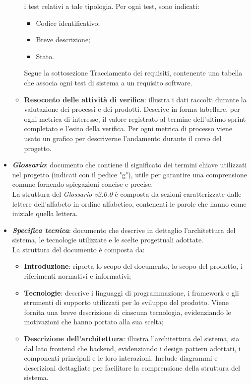 \begin{itemize}
\begin{itemize}
                        i test relativi a tale tipologia. Per ogni test, sono indicati:
                        \begin{itemize}
                              \item Codice identificativo;
                              \item Breve descrizione;
                              \item Stato.
                        \end{itemize}
                        Segue la sottosezione Tracciamento dei requisiti, contenente una tabella che associa
                        ogni test di sistema a un requisito software.
                  \item \textbf{Resoconto delle attività di verifica}: illustra i dati raccolti durante la valutazione dei processi e dei prodotti.
                        Descrive in forma tabellare, per ogni metrica di interesse, il valore registrato al termine dell'ultimo sprint
                        completato e l'esito della verifica. Per ogni metrica di processo viene usato un grafico per descriverne l'andamento
                        durante il corso del progetto.
            \end{itemize}
      \item \textit{\textbf{Glossario}}: documento che contiene il significato dei termini chiave utilizzati nel progetto (indicati con il pedice "g"), utile per garantire una comprensione comune fornendo spiegazioni concise e precise.
            \\La struttura del \textit{Glossario v2.0.0} è composta da sezioni caratterizzate dalle lettere dell'alfabeto in ordine alfabetico, contenenti le parole che hanno come iniziale quella lettera.
      
      \item \textit{\textbf{Specifica tecnica}}: documento che descrive in dettaglio l'architettura del sistema, le tecnologie utilizzate e le scelte progettuali adottate.\\
            La struttura del documento è composta da:
            \begin{itemize}
                  \item \textbf{Introduzione}: riporta lo scopo del documento, lo scopo del prodotto, i riferimenti normativi e informativi;
                  \item \textbf{Tecnologie}: descrive i linguaggi di programmazione, i framework e gli strumenti di supporto utilizzati per lo sviluppo del prodotto. Viene fornita una breve descrizione di ciascuna tecnologia, evidenziando le motivazioni che hanno portato alla sua scelta;
                  \item \textbf{Descrizione dell'architettura}: illustra l’architettura del sistema, sia dal lato frontend che backend, evidenziando i design pattern adottati, i componenti principali e le loro interazioni. Include diagrammi e descrizioni dettagliate per facilitare la comprensione della struttura del sistema.
            \end{itemize}


\end{itemize}
